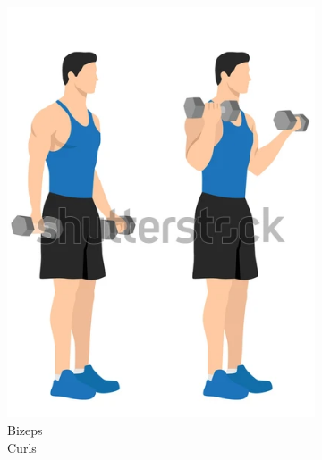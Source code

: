 \documentclass[journal]{IEEEtran}
\begin{document}
\begin{figure}[H]
    \begin{minipage}[t][3.5cm][b]{0.11\textwidth}
        \begin{figure}[H]
            \centering
            \includegraphics[width=\textwidth]{figures/curls.png}
            \caption{Bizeps\\Curls \cite{noauthor_notitle_2021-3}}
            \label{ref:fig_kNN_activity_1}
        \end{figure}
    \end{minipage}
    \begin{minipage}[t][3.5cm][b]{0.1\textwidth}
        \begin{figure}[H]
            \centering

\end{figure}
\end{minipage}
\end{figure}
\end{document}
